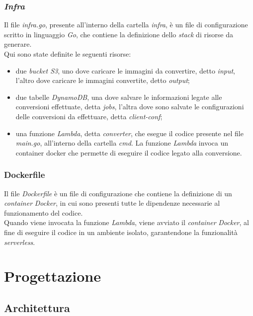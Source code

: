 \subsubsection{\emph{Infra}}

Il file \emph{infra.go}, presente all'interno della cartella \emph{infra}, è un file di configurazione scritto in linguaggio
\emph{Go}, che contiene la definizione dello \emph{stack} di risorse da
generare.\\
Qui sono state definite le seguenti risorse:
\begin{itemize}
      \item due \emph{bucket S3}, uno dove caricare le immagini da convertire,
            detto \emph{input}, l'altro dove caricare le immagini convertite, detto
            \emph{output};
      \item due tabelle \emph{DynamoDB}, una dove salvare le informazioni legate
            alle conversioni effettuate, detta \emph{jobs}, l'altra dove sono salvate le
            configurazioni delle conversioni da effettuare, detta \emph{client-conf};
      \item una funzione \emph{Lambda}, detta \emph{converter}, che esegue il
            codice presente nel file \emph{main.go}, all'interno della cartella
            \emph{cmd}. La funzione \emph{Lambda} invoca un \glsfirstoccur\gls{container}
            \glsfirstoccur\gls{docker} che permette di eseguire il codice legato
            alla conversione.
\end{itemize}

\subsubsection{Dockerfile}

Il file \emph{Dockerfile} è un file di configurazione che contiene la
definizione di un \emph{container} \emph{Docker}, in cui sono presenti tutte le
dipendenze necessarie al funzionamento del codice. \\
Quando viene invocata la funzione \emph{Lambda}, viene avviato il
\emph{container} \emph{Docker}, al fine di eseguire il codice in un ambiente
isolato, garantendone la funzionalità \emph{serverless}.

\section{Progettazione}

\subsection{Architettura}

